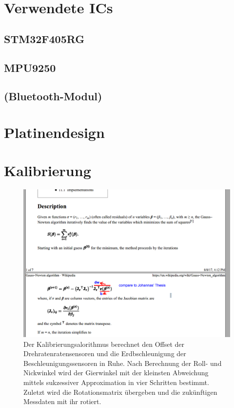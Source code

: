\section{Verwendete ICs}

	\subsection{STM32F405RG}
	
	\subsection{MPU9250}
	
	\subsection{(Bluetooth-Modul)}
	
\section{Platinendesign}

\newpage

\section{Kalibrierung}

	\begin{figure}[h]
		\centering
		\includegraphics[width=1\textwidth]{images/kalibrierung_algo}
		\caption[Flow-Chart des Kalibrierungsalorithmus]{Der Kalibrierungsalorithmus berechnet den Offset der Drehratenratensensoren und die Erdbschleunigung der Beschleunigungssensoren in Ruhe. Nach Berechnung der Roll- und Nickwinkel wird der Gierwinkel mit der kleinsten Abweichung mittels sukzessiver Approximation in vier Schritten bestimmt. Zuletzt wird die Rotationsmatrix übergeben und die zukünftigen Messdaten mit ihr rotiert.}
		\label{img:kalibrierung-algo}
	\end{figure}

